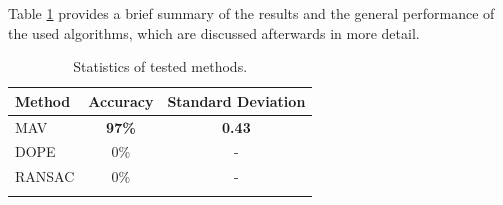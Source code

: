 Table \ref{tab:test-results} provides a brief summary of the results and the general performance of the used algorithms, which are discussed afterwards in more detail.

\begin{longtable}
{@{} l c c @{}} \toprule
\textbf{Method}                     & \textbf{Accuracy}     & \textbf{Standard Deviation}       \\ \midrule
MAV                                 & \textbf{97\% }                 & \textbf{0.43}                             \\ \midrule
DOPE                                & 0\%                  & -                             \\ \midrule
RANSAC                              & 0\%                   & -                             \\ \bottomrule
\caption{Statistics of tested methods.} \label{tab:test-results}                          \\
\end{longtable}


